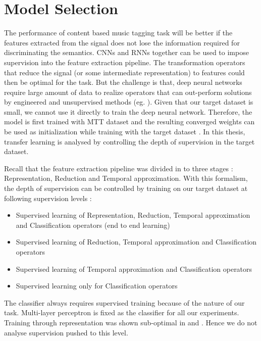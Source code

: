\section{Model Selection}
\label{model}
The performance of content based music tagging task will be better if the features extracted from the signal does not lose the information required for discriminating the semantics. CNNs and RNNs together can be used to impose supervision into the feature extraction pipeline. The transformation operators that reduce the signal (or some intermediate representation) to features could then be optimal for the task. But the challenge is that, deep neural networks require large amount of data to realize operators that can out-perform solutions by engineered and unsupervised methods (eg. \cite{featurelearn1}\cite{MultiScale}). Given that our target dataset is small, we cannot use it directly to train the deep neural network. Therefore, the model is first trained with MTT dataset and the resulting converged weights can be used as initialization while training with the target dataset\cite{TransferLearning} . In this thesis, transfer learning is analysed by controlling the depth of supervision in the target dataset. 
\bigskip

\noindent Recall that the feature extraction pipeline was divided in to three stages : Representation, Reduction and Temporal approximation. With this formalism, the depth of supervision can be controlled by training on our target dataset at following supervision levels :
\begin{itemize}
    \setlength\itemsep{0em}
    \item Supervised learning of Representation, Reduction, Temporal approximation and Classification operators (end to end learning)
    \item Supervised learning of Reduction, Temporal approximation and Classification operators
    \item Supervised learning of Temporal approximation and Classification operators
    \item Supervised learning only for Classification operators
\end{itemize}
The classifier always requires supervised training because of the nature of our task. Multi-layer perceptron is fixed as the classifier for all our experiments. Training through representation was shown sub-optimal in  \cite{EndToEnd} and \cite{choi_cnn}. Hence we do not analyse supervision pushed to this level. 

